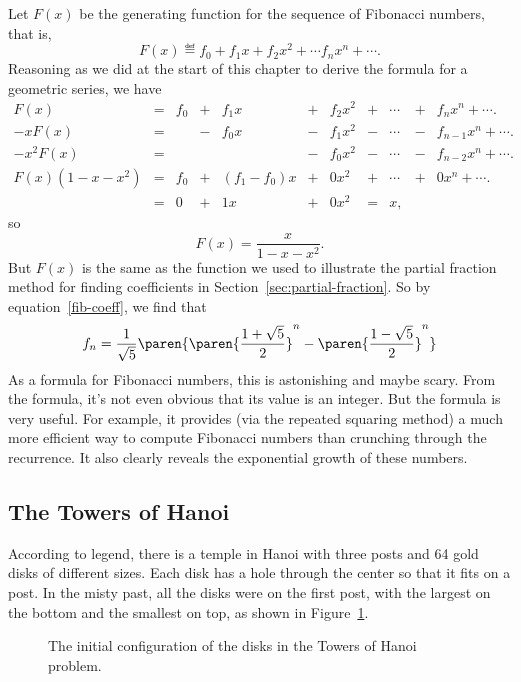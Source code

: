 Let $F(x)$ be the generating function for the sequence of
Fibonacci numbers, that is,
\[
F(x) \eqdef f_0 + f_1 x + f_2 x^2 + \cdots f_n x^n + \cdots.
\]
Reasoning as we did at the start of this chapter to derive the formula
for a geometric series, we have
\[
\begin{array}{rcrcrcrcrcrcr}
F(x)     & = & f_0 & + & f_1 x & + & f_2 x^2 & + & \cdots & + &    f_n x^n + \cdots.\\
-xF(x)   & = &     & - & f_0 x & - & f_1 x^2 & - & \cdots & - & f_{n-1} x^n + \cdots.\\
-x^2F(x) & = &     &   &       & - & f_0 x^2 & - & \cdots & - & f_{n-2} x^n + \cdots.\\
\hline
F(x)(1-x-x^2)
         & = & f_0 & + & (f_1-f_0) x
                               & + &   0 x^2 & + & \cdots & + & 0 x^n + \cdots.\\
         & = &  0  & + & 1   x & + &   0 x^2 & = & x,
\end{array}
\]
so
\[
F(x) = \frac{x}{1 - x - x^2}.
\]
But $F(x)$ is the same as the function we used to illustrate the
partial fraction method for finding coefficients in
Section~\ref{sec:partial-fraction}.  So by equation~\eqref{fib-coeff},
we find that
\[
 f_n  = \frac{1}{\sqrt{5}}
      \paren{
      \paren{\frac{1 + \sqrt{5}}{2}}^n -
      \paren{\frac{1 - \sqrt{5}}{2}}^n}
\]
As a formula for Fibonacci numbers, this is astonishing and maybe
scary.  From the formula, it's not even obvious that its value is an
integer.  But the formula is very useful.  For example, it provides
(via the repeated squaring method) a much more efficient way to
compute Fibonacci numbers than crunching through the recurrence.  It
also clearly reveals the exponential growth of these numbers.

\subsection{The Towers of Hanoi}\label{hanoi-subsec}
According to legend, there is a temple in Hanoi with three posts and
64 gold disks of different sizes.  Each disk has a hole through the
center so that it fits on a post.  In the misty past, all the disks
were on the first post, with the largest on the bottom and the
smallest on top, as shown in Figure~\ref{fig:10A1}.

\begin{figure}


\caption{The initial configuration of the disks in the Towers of Hanoi
  problem.}

\label{fig:10A1}

\end{figure}

